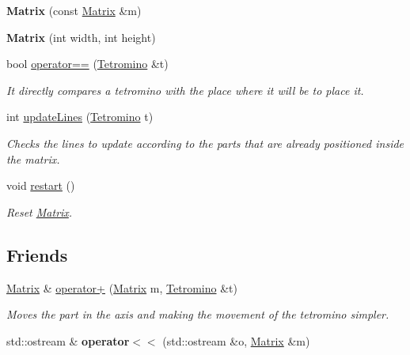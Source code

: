 \begin{DoxyCompactItemize}
\mbox{\label{classMatrix_a765f4dcb51b6829311cc3e7576388423}} 
{\bfseries Matrix} (const \hyperlink{classMatrix}{Matrix} \&m)
\item 
\mbox{\label{classMatrix_a5d5b33d74cf6443d9c2b6242b3f7e320}} 
{\bfseries Matrix} (int width, int height)
\item 
bool \hyperlink{classMatrix_a993ef93c4c0b32047586dd3e3a981853}{operator==} (\hyperlink{classTetromino}{Tetromino} \&t)
\begin{DoxyCompactList}\small\item\em It directly compares a tetromino with the place where it will be to place it. \end{DoxyCompactList}\item 
int \hyperlink{classMatrix_abd7645de0cb39d103a96c0f905a1cebe}{update\+Lines} (\hyperlink{classTetromino}{Tetromino} t)
\begin{DoxyCompactList}\small\item\em Checks the lines to update according to the parts that are already positioned inside the matrix. \end{DoxyCompactList}\item 
\mbox{\label{classMatrix_abb14e34d409ecd4133c2840755b556b7}} 
void \hyperlink{classMatrix_abb14e34d409ecd4133c2840755b556b7}{restart} ()
\begin{DoxyCompactList}\small\item\em Reset \hyperlink{classMatrix}{Matrix}. \end{DoxyCompactList}\end{DoxyCompactItemize}
\subsection*{Friends}
\begin{DoxyCompactItemize}
\item 
\hyperlink{classMatrix}{Matrix} \& \hyperlink{classMatrix_ac1bb2cc60467d7aaa22c10217f500ec9}{operator+} (\hyperlink{classMatrix}{Matrix} m, \hyperlink{classTetromino}{Tetromino} \&t)
\begin{DoxyCompactList}\small\item\em Moves the part in the axis and making the movement of the tetromino simpler. \end{DoxyCompactList}\item 
\mbox{\label{classMatrix_ae94f48053f851e77e8f461e5ab1e3fdd}} 
std\+::ostream \& {\bfseries operator$<$$<$} (std\+::ostream \&o, \hyperlink{classMatrix}{Matrix} \&m)
\end{DoxyCompactItemize}


